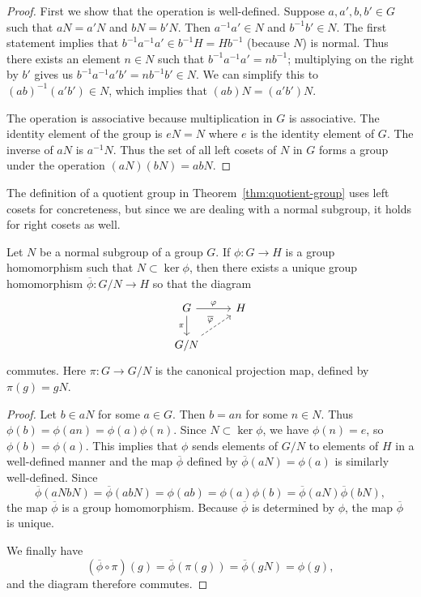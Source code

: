 \begin{proof}
    First we show that the operation is well-defined. Suppose \(a, a', b, b' \in G\) such that \(aN = a'N\) and \(bN = b'N\). Then \(a^{-1}a' \in N\) and \(b^{-1}b' \in N\). The first statement implies that \(b^{-1}a^{-1}a' \in b^{-1}H = Hb^{-1}\) (because \(N\)) is normal. Thus there exists an element \(n \in N\) such that \(b^{-1}a^{-1}a' = nb^{-1}\); multiplying on the right by \(b'\) gives us \(b^{-1}a^{-1}a'b' = nb^{-1}b' \in N\). We can simplify this to \((ab)^{-1}(a'b') \in N\), which implies that \((ab)N = (a'b')N\).

    The operation is associative because multiplication in \(G\) is associative. The identity element of the group is \(eN = N\) where \(e\) is the identity element of \(G\). The inverse of \(aN\) is \(a^{-1}N\). Thus the set of all left cosets of \(N\) in \(G\) forms a group under the operation \((aN)(bN) = abN\).
\end{proof}

\begin{remark}
    The definition of a quotient group in Theorem~\ref{thm:quotient-group} uses left cosets for concreteness, but since we are dealing with a normal subgroup, it holds for right cosets as well.
\end{remark}

\begin{theorem}
    \label{thm:induced-homomorphism}
    Let \(N\) be a normal subgroup of a group \(G\). If \(\phi: G \to H\) is a group homomorphism such that \(N \subset \ker \phi\), then there exists a unique group homomorphism \(\overline{\phi}: G/N \to H\) so that the diagram
    \[
        \begin{tikzcd}
            G \arrow{r}{\phi} \arrow[swap]{d}{\pi} & H \\
            G/N \arrow[dashed]{ur}{\overline{\phi}}
        \end{tikzcd}
    \]
    commutes. Here \(\pi: G \to G/N\) is the canonical projection map, defined by \(\pi(g) = gN\).
\end{theorem}

\begin{proof}
    Let \(b \in aN\) for some \(a \in G\). Then \(b = an\) for some \(n \in N\). Thus \(\phi(b) = \phi(an) = \phi(a)\phi(n)\). Since \(N \subset \ker \phi\), we have \(\phi(n) = e\), so \(\phi(b) = \phi(a)\). This implies that \(\phi\) sends elements of \(G/N\) to elements of \(H\) in a well-defined manner and the map \(\overline{\phi}\) defined by \(\overline{\phi}(aN) = \phi(a)\) is similarly well-defined. Since
    \[
    \overline{\phi}(aNbN) = \overline{\phi}(abN) = \phi(ab) = \phi(a)\phi(b) = \overline{\phi}(aN)\overline{\phi}(bN),
    \]
    the map \(\overline{\phi}\) is a group homomorphism. Because \(\overline{\phi}\) is determined by \(\phi\), the map \(\overline{\phi}\) is unique.

    We finally have
    \[
        (\overline{\phi} \circ \pi)(g) = \overline{\phi}(\pi(g)) = \overline{\phi}(gN) = \phi(g),
    \]
    and the diagram therefore commutes.
\end{proof}

